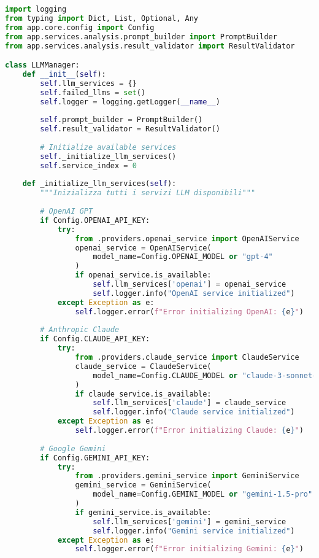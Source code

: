 \documentclass[12pt,a4paper]{report}
\begin{document}
\begin{lstlisting}[language=Python, caption=LLM Manager Implementation]
import logging
from typing import Dict, List, Optional, Any
from app.core.config import Config
from app.services.analysis.prompt_builder import PromptBuilder
from app.services.analysis.result_validator import ResultValidator

class LLMManager:
    def __init__(self):
        self.llm_services = {}
        self.failed_llms = set()
        self.logger = logging.getLogger(__name__)
        
        self.prompt_builder = PromptBuilder()
        self.result_validator = ResultValidator()
        
        # Initialize available services
        self._initialize_llm_services()
        self.service_index = 0
    
    def _initialize_llm_services(self):
        """Inizializza tutti i servizi LLM disponibili"""
        
        # OpenAI GPT
        if Config.OPENAI_API_KEY:
            try:
                from .providers.openai_service import OpenAIService
                openai_service = OpenAIService(
                    model_name=Config.OPENAI_MODEL or "gpt-4"
                )
                if openai_service.is_available:
                    self.llm_services['openai'] = openai_service
                    self.logger.info("OpenAI service initialized")
            except Exception as e:
                self.logger.error(f"Error initializing OpenAI: {e}")
        
        # Anthropic Claude
        if Config.CLAUDE_API_KEY:
            try:
                from .providers.claude_service import ClaudeService
                claude_service = ClaudeService(
                    model_name=Config.CLAUDE_MODEL or "claude-3-sonnet-20240229"
                )
                if claude_service.is_available:
                    self.llm_services['claude'] = claude_service
                    self.logger.info("Claude service initialized")
            except Exception as e:
                self.logger.error(f"Error initializing Claude: {e}")
        
        # Google Gemini
        if Config.GEMINI_API_KEY:
            try:
                from .providers.gemini_service import GeminiService
                gemini_service = GeminiService(
                    model_name=Config.GEMINI_MODEL or "gemini-1.5-pro"
                )
                if gemini_service.is_available:
                    self.llm_services['gemini'] = gemini_service
                    self.logger.info("Gemini service initialized")
            except Exception as e:
                self.logger.error(f"Error initializing Gemini: {e}")
        

\end{lstlisting}
\end{document}
